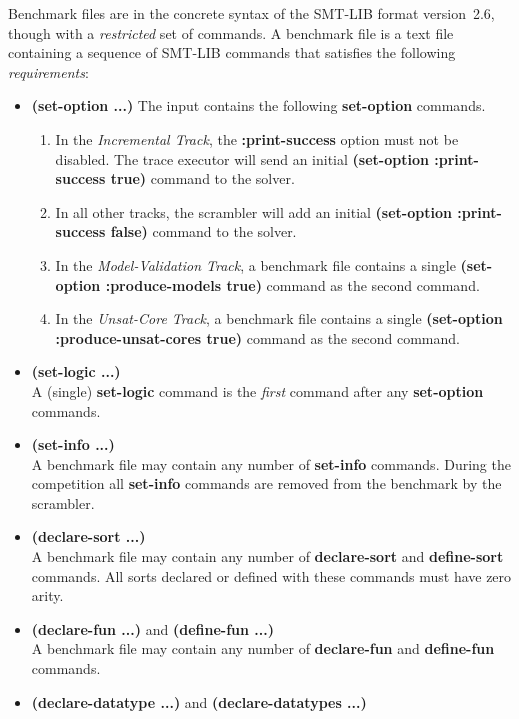 \documentclass[12pt]{article}
\newcommand{\akey}[1]{\textbf{#1}\xspace}
\newcommand{\bkey}[1]{\textbf{{#1}}\xspace}
\newcommand{\inctrack}{Incremental Track\xspace}
\newcommand{\ucoretrack}{Unsat-Core Track\xspace}
\newcommand{\mvaltrack}{Model-Validation Track\xspace}
\begin{document}
Benchmark files are in the concrete syntax of the SMT-LIB format
version~2.6, though with a \emph{restricted} set of commands.  A benchmark
file is a text file containing a sequence of SMT-LIB commands that
satisfies the following \emph{requirements}:
%
\begin{itemize}
  \item
    \bkey{(set-option ...)}
    The input contains the following \akey{set-option} commands.
    \begin{enumerate}[label=(\alph*)]
    \item In the \emph{\inctrack}, the \akey{:print-success} option
      must not be disabled.  The trace executor will send an initial
      \akey{(set-option :print-success true)} command to the solver.
    \item In all other tracks, the scrambler will add an initial
      \akey{(set-option :print-success false)} command to the solver.
    \item In the \emph{\mvaltrack}, a benchmark file contains a single
      \akey{(set-option :produce-models true)} command as the second command.
    \item In the \emph{\ucoretrack}, a benchmark file contains a
      single \akey{(set-option :produce-unsat-cores true)} command as
      the second command.
    \end{enumerate}
  \item \bkey{(set-logic ...)}\\
    A (single) \akey{set-logic} command is the \emph{first} command after
    any \akey{set-option} commands.
  \item \bkey{(set-info ...)}\\
    A benchmark file may contain any number of \akey{set-info} commands.
    During the competition all \akey{set-info} commands are removed from
    the benchmark by the scrambler.
  \item \bkey{(declare-sort ...)}\\
    A benchmark file may contain any number of \akey{declare-sort} and
    \akey{define-sort} commands.  All sorts declared or defined with these
    commands must have zero arity.
  \item \bkey{(declare-fun ...)} and \bkey{(define-fun ...)}\\
    A benchmark file may contain any number of \akey{declare-fun} and
    \akey{define-fun} commands.
  \item \bkey{(declare-datatype ...)} and \bkey{(declare-datatypes ...)}\\

\end{itemize}
\end{document}
